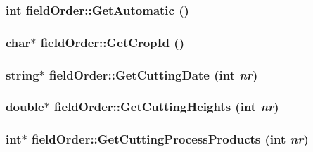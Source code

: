 \hypertarget{classfield_order_adef295eae96752f77f6c0c4220ae984b}{
\subsubsection[{GetAutomatic}]{\setlength{\rightskip}{0pt plus 5cm}int fieldOrder::GetAutomatic ()}}
\label{classfield_order_adef295eae96752f77f6c0c4220ae984b}
\hypertarget{classfield_order_a9cf0299ebb246ebe453078771d67a3a7}{
\subsubsection[{GetCropId}]{\setlength{\rightskip}{0pt plus 5cm}char$\ast$ fieldOrder::GetCropId ()}}
\label{classfield_order_a9cf0299ebb246ebe453078771d67a3a7}
\hypertarget{classfield_order_a57e54f1af70e4b04e561bb49199b97ea}{
\subsubsection[{GetCuttingDate}]{\setlength{\rightskip}{0pt plus 5cm}string$\ast$ fieldOrder::GetCuttingDate (int {\em nr})}}
\label{classfield_order_a57e54f1af70e4b04e561bb49199b97ea}
\hypertarget{classfield_order_a3e16969fe416cd10fd327f19e37194d4}{
\subsubsection[{GetCuttingHeights}]{\setlength{\rightskip}{0pt plus 5cm}double$\ast$ fieldOrder::GetCuttingHeights (int {\em nr})}}
\label{classfield_order_a3e16969fe416cd10fd327f19e37194d4}
\hypertarget{classfield_order_aab414a15c455a7b0146a9e84a5a4e1c8}{
\subsubsection[{GetCuttingProcessProducts}]{\setlength{\rightskip}{0pt plus 5cm}int$\ast$ fieldOrder::GetCuttingProcessProducts (int {\em nr})}}
